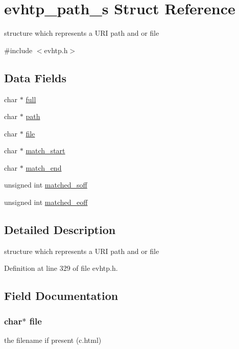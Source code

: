 \hypertarget{structevhtp__path__s}{
\section{evhtp\_\-path\_\-s Struct Reference}
\label{structevhtp__path__s}
}


structure which represents a URI path and or file  




{\ttfamily \#include $<$evhtp.h$>$}

\subsection*{Data Fields}
\begin{DoxyCompactItemize}
\item 
char $\ast$ \hyperlink{structevhtp__path__s_a3deff62337b4ec745307f4410d7ff6ce}{full}
\item 
char $\ast$ \hyperlink{structevhtp__path__s_a44196e6a5696d10442c29e639437196e}{path}
\item 
char $\ast$ \hyperlink{structevhtp__path__s_adf16cd437526a5c5e0e0af87745acbb8}{file}
\item 
char $\ast$ \hyperlink{structevhtp__path__s_a25d9dc60fbb26e1c4898184e1e46e9ab}{match\_\-start}
\item 
char $\ast$ \hyperlink{structevhtp__path__s_aa1f13c993b57860b101d02bc62bb801b}{match\_\-end}
\item 
unsigned int \hyperlink{structevhtp__path__s_af11f4fc41ab5561c5d430cedfa5e53d8}{matched\_\-soff}
\item 
unsigned int \hyperlink{structevhtp__path__s_ae9fc73e1697747df74873f20d91db690}{matched\_\-eoff}
\end{DoxyCompactItemize}


\subsection{Detailed Description}
structure which represents a URI path and or file 

Definition at line 329 of file evhtp.h.



\subsection{Field Documentation}
\hypertarget{structevhtp__path__s_adf16cd437526a5c5e0e0af87745acbb8}{
\subsubsection[{file}]{\setlength{\rightskip}{0pt plus 5cm}char$\ast$ {\bf file}}}
\label{structevhtp__path__s_adf16cd437526a5c5e0e0af87745acbb8}
the filename if present (c.html) 

